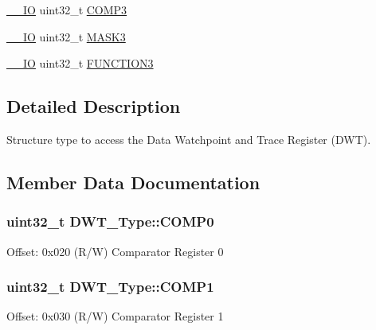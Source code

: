 \begin{DoxyCompactItemize}
\item 
\hyperlink{core__cm4_8h_aec43007d9998a0a0e01faede4133d6be}{\+\_\+\+\_\+\+IO} uint32\+\_\+t \hyperlink{struct_d_w_t___type_a3df15697eec279dbbb4b4e9d9ae8b62f}{C\+O\+M\+P3}
\item 
\hyperlink{core__cm4_8h_aec43007d9998a0a0e01faede4133d6be}{\+\_\+\+\_\+\+IO} uint32\+\_\+t \hyperlink{struct_d_w_t___type_ae3f01137a8d28c905ddefe7333547fba}{M\+A\+S\+K3}
\item 
\hyperlink{core__cm4_8h_aec43007d9998a0a0e01faede4133d6be}{\+\_\+\+\_\+\+IO} uint32\+\_\+t \hyperlink{struct_d_w_t___type_a80bd242fc05ca80f9db681ce4d82e890}{F\+U\+N\+C\+T\+I\+O\+N3}
\end{DoxyCompactItemize}


\subsection{Detailed Description}
Structure type to access the Data Watchpoint and Trace Register (D\+WT). 

\subsection{Member Data Documentation}
\subsubsection[{\texorpdfstring{C\+O\+M\+P0}{COMP0}}]{ uint32\+\_\+t D\+W\+T\+\_\+\+Type\+::\+C\+O\+M\+P0}\hypertarget{struct_d_w_t___type_a7cf71ff4b30a8362690fddd520763904}{}\label{struct_d_w_t___type_a7cf71ff4b30a8362690fddd520763904}
Offset\+: 0x020 (R/W) Comparator Register 0 
\subsubsection[{\texorpdfstring{C\+O\+M\+P1}{COMP1}}]{ uint32\+\_\+t D\+W\+T\+\_\+\+Type\+::\+C\+O\+M\+P1}\hypertarget{struct_d_w_t___type_a4a5bb70a5ce3752bd628d5ce5658cb0c}{}\label{struct_d_w_t___type_a4a5bb70a5ce3752bd628d5ce5658cb0c}
Offset\+: 0x030 (R/W) Comparator Register 1 
